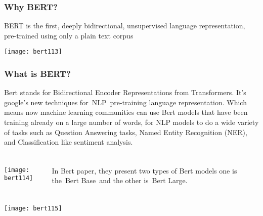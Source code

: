 \begin{frame}[fragile]\frametitle{Why BERT?}

BERT is the first, deeply bidirectional, unsupervised language representation, pre-trained using only a plain text corpus

			\begin{center}
			\texttt{[image: bert113]}
			\end{center}		
			

\end{frame}

\begin{frame}[fragile]\frametitle{What is BERT?}


			\begin{center}
Bert stands for Bidirectional Encoder Representations from Transformers. It’s google’s new techniques for NLP pre-training language representation. Which means now machine learning communities can use Bert models that have been training already on a large number of words, for NLP models to do a wide variety of tasks such as Question Answering tasks, Named Entity Recognition (NER), and Classification like sentiment analysis.
			\end{center}		
			

\end{frame}

\begin{frame}[fragile]\frametitle{}

\begin{columns}
    \begin{column}[T]{0.5\linewidth}
			\begin{center}
			\texttt{[image: bert114]}
			\end{center}		
		\end{column}
    \begin{column}[T]{0.5\linewidth}
In Bert paper, they present two types of Bert models one is the Bert Base and the other is Bert Large.

    \end{column}
  \end{columns}
			
\end{frame}

\begin{frame}[fragile]\frametitle{}


			\begin{center}
			\texttt{[image: bert115]}
			\end{center}		
			

\end{frame}

